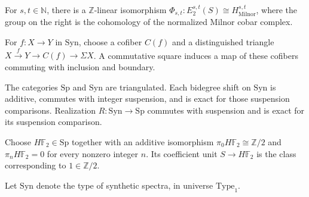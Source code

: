 \begin{definition}
\label{frontier:AdamsSynthetic:8b66ee46e41e}
For $s,t\in\mathbb N$, there is a $\mathbb Z$-linear isomorphism $\Phi_{s,t}\colon E_2^{s,t}(S)\cong H^{s,t}_{\mathrm{Milnor}}$, where the group on the right is the cohomology of the normalized Milnor cobar complex.
\end{definition}

\begin{definition}
\label{frontier:AdamsSynthetic:c264cb4f3291}
For $f\colon X\to Y$ in $\mathrm{Syn}$, choose a cofiber $C(f)$ and a distinguished triangle $X\xrightarrow f Y\to C(f)\to\Sigma X$. A commutative square induces a map of these cofibers commuting with inclusion and boundary.
\end{definition}

\begin{definition}
\label{frontier:AdamsSynthetic:d505f4e20090}
The categories $\mathrm{Sp}$ and $\mathrm{Syn}$ are triangulated. Each bidegree shift on $\mathrm{Syn}$ is additive, commutes with integer suspension, and is exact for those suspension comparisons. Realization $R\colon\mathrm{Syn}\to\mathrm{Sp}$ commutes with suspension and is exact for its suspension comparison.
\end{definition}

\begin{definition}
\label{frontier:AdamsSynthetic:e9439d4312f5}
Choose $H\mathbb F_2\in\mathrm{Sp}$ together with an additive isomorphism $\pi_0H\mathbb F_2\cong\mathbb Z/2$ and $\pi_nH\mathbb F_2=0$ for every nonzero integer $n$. Its coefficient unit $S\to H\mathbb F_2$ is the class corresponding to $1\in\mathbb Z/2$.
\end{definition}

\begin{definition}
\label{frontier:AdamsSynthetic:eaf500baffc5}
Let $\mathrm{Syn}$ denote the type of synthetic spectra, in universe $\mathrm{Type}_1$.
\end{definition}

